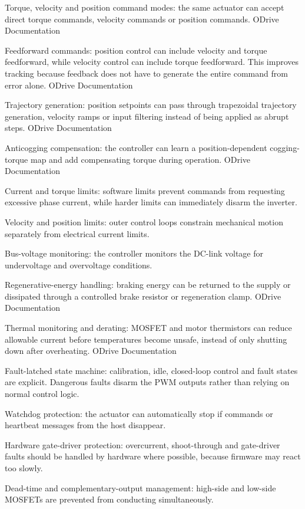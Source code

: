 {	Torque, velocity and position command modes: the same actuator can accept direct torque commands, velocity commands or position commands. ODrive Documentation

	Feedforward commands: position control can include velocity and torque feedforward, while velocity control can include torque feedforward. This improves tracking because feedback does not have to generate the entire command from error alone. ODrive Documentation

	Trajectory generation: position setpoints can pass through trapezoidal trajectory generation, velocity ramps or input filtering instead of being applied as abrupt steps. ODrive Documentation

	Anticogging compensation: the controller can learn a position-dependent cogging-torque map and add compensating torque during operation. ODrive Documentation

	Current and torque limits: software limits prevent commands from requesting excessive phase current, while harder limits can immediately disarm the inverter.

	Velocity and position limits: outer control loops constrain mechanical motion separately from electrical current limits.

	Bus-voltage monitoring: the controller monitors the DC-link voltage for undervoltage and overvoltage conditions.

	Regenerative-energy handling: braking energy can be returned to the supply or dissipated through a controlled brake resistor or regeneration clamp. ODrive Documentation

	Thermal monitoring and derating: MOSFET and motor thermistors can reduce allowable current before temperatures become unsafe, instead of only shutting down after overheating. ODrive Documentation

	Fault-latched state machine: calibration, idle, closed-loop control and fault states are explicit. Dangerous faults disarm the PWM outputs rather than relying on normal control logic.

	Watchdog protection: the actuator can automatically stop if commands or heartbeat messages from the host disappear.

	Hardware gate-driver protection: overcurrent, shoot-through and gate-driver faults should be handled by hardware where possible, because firmware may react too slowly.

	Dead-time and complementary-output management: high-side and low-side MOSFETs are prevented from conducting simultaneously.

}
